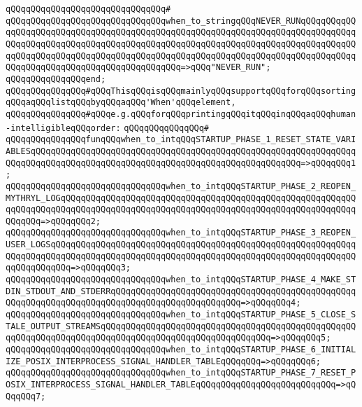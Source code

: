 \verb|qQQqqQQqqQQqqQQqqQQqqQQqqQQqqQQq#|\newline
\verb|qQQqqQQqqQQqqQQqqQQqqQQqqQQqqQQqwhen_to_stringqQQqNEVER_RUNqQQqqQQqqQQqqQQqqQQqqQQqqQQqqQQqqQQqqQQqqQQqqQQqqQQqqQQqqQQqqQQqqQQqqQQqqQQqqQQqqQQqqQQqqQQqqQQqqQQqqQQqqQQqqQQqqQQqqQQqqQQqqQQqqQQqqQQqqQQqqQQqqQQqqQQqqQQqqQQqqQQqqQQqqQQqqQQqqQQqqQQqqQQqqQQqqQQqqQQqqQQqqQQqqQQqqQQqqQQqqQQqqQQqqQQqqQQqqQQqqQQqqQQqqQQqqQQq=>qQQq"NEVER_RUN";|\newline
\verb|qQQqqQQqqQQqqQQqend;|\newline
\newline
\verb|qQQqqQQqqQQqqQQq#qQQqThisqQQqisqQQqmainlyqQQqsupportqQQqforqQQqsortingqQQqaqQQqlistqQQqbyqQQqaqQQq'When'qQQqelement,|\newline
\verb|qQQqqQQqqQQqqQQq#qQQqe.g.qQQqforqQQqprintingqQQqitqQQqinqQQqaqQQqhuman-intelligibleqQQqorder:|\newline
\verb|qQQqqQQqqQQqqQQq#|\newline
\verb|qQQqqQQqqQQqqQQqfunqQQqwhen_to_intqQQqSTARTUP_PHASE_1_RESET_STATE_VARIABLESqQQqqQQqqQQqqQQqqQQqqQQqqQQqqQQqqQQqqQQqqQQqqQQqqQQqqQQqqQQqqQQqqQQqqQQqqQQqqQQqqQQqqQQqqQQqqQQqqQQqqQQqqQQqqQQqqQQqqQQqqQQq=>qQQqqQQq1;|\newline
\verb|qQQqqQQqqQQqqQQqqQQqqQQqqQQqqQQqwhen_to_intqQQqSTARTUP_PHASE_2_REOPEN_MYTHRYL_LOGqQQqqQQqqQQqqQQqqQQqqQQqqQQqqQQqqQQqqQQqqQQqqQQqqQQqqQQqqQQqqQQqqQQqqQQqqQQqqQQqqQQqqQQqqQQqqQQqqQQqqQQqqQQqqQQqqQQqqQQqqQQqqQQqqQQqqQQq=>qQQqqQQq2;|\newline
\verb|qQQqqQQqqQQqqQQqqQQqqQQqqQQqqQQqwhen_to_intqQQqSTARTUP_PHASE_3_REOPEN_USER_LOGSqQQqqQQqqQQqqQQqqQQqqQQqqQQqqQQqqQQqqQQqqQQqqQQqqQQqqQQqqQQqqQQqqQQqqQQqqQQqqQQqqQQqqQQqqQQqqQQqqQQqqQQqqQQqqQQqqQQqqQQqqQQqqQQqqQQqqQQqqQQqqQQq=>qQQqqQQq3;|\newline
\verb|qQQqqQQqqQQqqQQqqQQqqQQqqQQqqQQqwhen_to_intqQQqSTARTUP_PHASE_4_MAKE_STDIN_STDOUT_AND_STDERRqQQqqQQqqQQqqQQqqQQqqQQqqQQqqQQqqQQqqQQqqQQqqQQqqQQqqQQqqQQqqQQqqQQqqQQqqQQqqQQqqQQqqQQqqQQqqQQq=>qQQqqQQq4;|\newline
\verb|qQQqqQQqqQQqqQQqqQQqqQQqqQQqqQQqwhen_to_intqQQqSTARTUP_PHASE_5_CLOSE_STALE_OUTPUT_STREAMSqQQqqQQqqQQqqQQqqQQqqQQqqQQqqQQqqQQqqQQqqQQqqQQqqQQqqQQqqQQqqQQqqQQqqQQqqQQqqQQqqQQqqQQqqQQqqQQqqQQqqQQq=>qQQqqQQq5;|\newline
\verb|qQQqqQQqqQQqqQQqqQQqqQQqqQQqqQQqwhen_to_intqQQqSTARTUP_PHASE_6_INITIALIZE_POSIX_INTERPROCESS_SIGNAL_HANDLER_TABLEqQQqqQQq=>qQQqqQQq6;|\newline
\verb|qQQqqQQqqQQqqQQqqQQqqQQqqQQqqQQqwhen_to_intqQQqSTARTUP_PHASE_7_RESET_POSIX_INTERPROCESS_SIGNAL_HANDLER_TABLEqQQqqQQqqQQqqQQqqQQqqQQqqQQq=>qQQqqQQq7;|\newline
